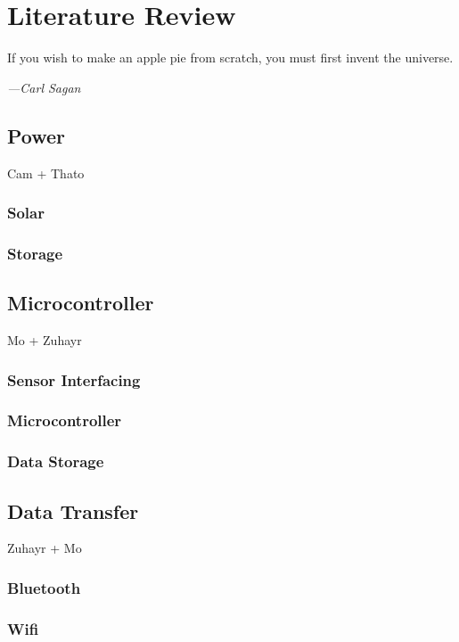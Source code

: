 \documentclass[class=report,11pt,crop=false]{standalone}
\begin{document}
\ifstandalone
\tableofcontents
\fi
\chapter{Literature Review \label{ch:literature}}
\epigraph{If you wish to make an apple pie from scratch, you must first invent the universe.}%
    {\emph{---Carl Sagan}}
\vspace{0.5cm}
\section{Power}
Cam + Thato

\subsection{Solar}

\subsection{Storage}

\section{Microcontroller}
Mo + Zuhayr

\subsection{Sensor Interfacing}

\subsection{Microcontroller}

\subsection{Data Storage}

\section{Data Transfer}
Zuhayr + Mo

\subsection{Bluetooth}

\subsection{Wifi}
\end{document}
